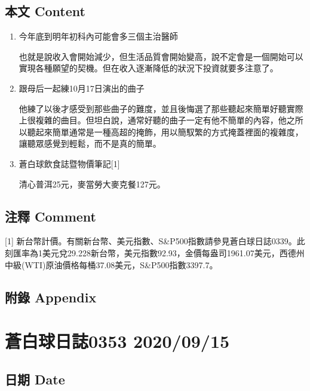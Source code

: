 \documentclass[
]{article}
\begin{document}
\hypertarget{ux672cux6587-content-13}{%
\subsection{本文 Content}\label{ux672cux6587-content-13}}

\begin{enumerate}
\def\labelenumi{\arabic{enumi}.}
\item
  今年底到明年初科內可能會多三個主治醫師

  也就是說收入會開始減少，但生活品質會開始變高，說不定會是一個開始可以實現各種願望的契機。但在收入逐漸降低的狀況下投資就要多注意了。
\item
  跟母后一起練10月17日演出的曲子

  他練了以後才感受到那些曲子的難度，並且後悔選了那些聽起來簡單好聽實際上很複雜的曲目。但坦白說，通常好聽的曲子一定有他不簡單的內容，他之所以聽起來簡單通常是一種高超的掩飾，用以簡馭繁的方式掩蓋裡面的複雜度，讓聽眾感覺到輕鬆，而不是真的簡單。
\item
  蒼白球飲食誌暨物價筆記{[}1{]}

  清心普洱25元，麥當勞大麥克餐127元。
\end{enumerate}

\hypertarget{ux6ce8ux91cb-comment-13}{%
\subsection{注釋 Comment}\label{ux6ce8ux91cb-comment-13}}

{[}1{]}
新台幣計價。有關新台幣、美元指數、S\&P500指數請參見蒼白球日誌0339。此刻匯率為1美元兌29.228新台幣，美元指數92.93，金價每盎司1961.07美元，西德州中級(WTI)原油價格每桶37.08美元，S\&P500指數3397.7。

\hypertarget{ux9644ux9304-appendix-13}{%
\subsection{附錄 Appendix}\label{ux9644ux9304-appendix-13}}

\hypertarget{ux84bcux767dux7403ux65e5ux8a8c0353-20200915}{%
\section{蒼白球日誌0353
2020/09/15}\label{ux84bcux767dux7403ux65e5ux8a8c0353-20200915}}

\hypertarget{ux65e5ux671f-date-14}{%
\subsection{日期 Date}\label{ux65e5ux671f-date-14}}
\end{document}
